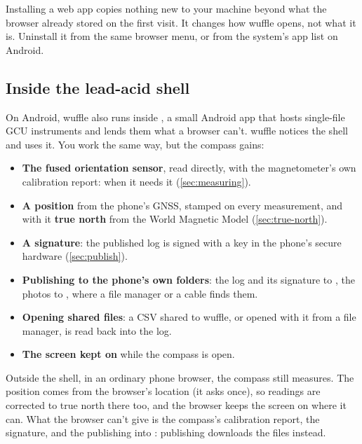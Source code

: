 \begin{note}
Installing a web app copies nothing new to your machine beyond what the browser already stored on the
first visit. It changes how wuffle opens, not what it is. Uninstall it from the same browser menu, or
from the system's app list on Android.
\end{note}

\subsection{Inside the lead-acid shell}\label{sec:run-shell}

On Android, wuffle also runs inside , a small Android app that hosts single-file GCU
instruments and lends them what a browser can't. wuffle notices the shell and uses it. You work the same
way, but the compass gains:

\begin{itemize}
\item \textbf{The fused orientation sensor}, read directly, with the magnetometer's own calibration
report:  when it needs it
(\cref{sec:measuring}).
\item \textbf{A position} from the phone's GNSS, stamped on every measurement, and with it \textbf{true
north} from the World Magnetic Model (\cref{sec:true-north}).
\item \textbf{A signature}: the published log is signed with a key in the phone's secure hardware
(\cref{sec:publish}).
\item \textbf{Publishing to the phone's own folders}: the log and its signature to ,
the photos to , where a file manager or a cable finds them.
\item \textbf{Opening shared files}: a CSV shared to wuffle, or opened with it from a file manager, is
read back into the log.
\item \textbf{The screen kept on} while the compass is open.
\end{itemize}

Outside the shell, in an ordinary phone browser, the compass still measures. The position comes from the
browser's location (it asks once), so readings are corrected to true north there too, and the browser keeps
the screen on where it can. What the browser can't give is the compass's calibration report, the signature,
and the publishing into : publishing downloads the files instead.

